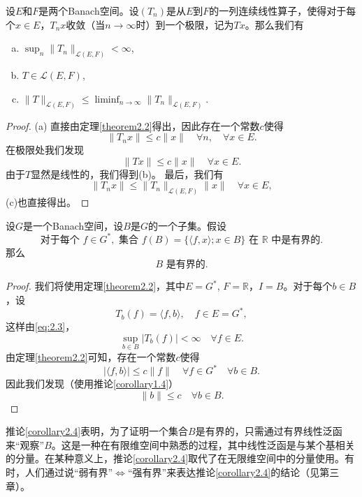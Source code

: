 \begin{corollary}\label{corollary2.3}
设$E$和$F$是两个Banach空间。设$(T_n)$是从$E$到$F$的一列连续线性算子，使得对于每个$x \in E$，$T_n x$收敛（当$n \to \infty$时）到一个极限，记为$Tx$。那么我们有
\begin{enumerate}[(a)]
\item $\sup_n \|T_n\|_{\mathcal{L}(E,F)} < \infty$,
\item $T \in \mathcal{L}(E,F)$,
\item $\|T\|_{\mathcal{L}(E,F)} \leq \liminf_{n \to \infty} \|T_n\|_{\mathcal{L}(E,F)}$.
\end{enumerate}
\end{corollary}

\begin{proof}
(a) 直接由定理\ref{theorem2.2}得出，因此存在一个常数$c$使得
\[
\|T_n x\| \leq c\|x\| \quad \forall n, \quad \forall x \in E.
\]
在极限处我们发现
\[
\|Tx\| \leq c\|x\| \quad \forall x \in E.
\]
由于$T$显然是线性的，我们得到(b)。
最后，我们有
\[
\|T_n x\| \leq \|T_n\|_{\mathcal{L}(E,F)} \|x\| \quad \forall x \in E,
\]
(c)也直接得出。
\end{proof}

\begin{corollary}\label{corollary2.4}
设$G$是一个Banach空间，设$B$是$G$的一个子集。假设
\begin{equation}
\text{对于每个 } f \in G^*, \text{ 集合 } f(B) = \{\langle f, x \rangle; x \in B\} \text{ 在 } \mathbb{R} \text{ 中是有界的}. \label{eq:2.3}
\end{equation}
那么
\begin{equation}
B \text{ 是有界的}. \label{eq:2.4}
\end{equation}
\end{corollary}

\begin{proof}
我们将使用定理\ref{theorem2.2}，其中$E=G^*$, $F=\mathbb{R}$，$I=B$。对于每个$b \in B$，设
\[
T_b(f) = \langle f, b \rangle, \quad f \in E = G^*,
\]
这样由\eqref{eq:2.3}，
\[
\sup_{b \in B} |T_b(f)| < \infty \quad \forall f \in E.
\]
由定理\ref{theorem2.2}可知，存在一个常数$c$使得
\[
|\langle f, b \rangle| \leq c\|f\| \quad \forall f \in G^* \quad \forall b \in B.
\]
因此我们发现（使用推论\ref{corollary1.4}）
\[
\|b\| \leq c \quad \forall b \in B.
\]
\end{proof}

\begin{remark}
推论\ref{corollary2.4}表明，为了证明一个集合$B$是有界的，只需通过有界线性泛函来“观察”$B$。这是一种在有限维空间中熟悉的过程，其中线性泛函是与某个基相关的分量。在某种意义上，推论\ref{corollary2.4}取代了在无限维空间中的分量使用。有时，人们通过说“弱有界”$\iff$“强有界”来表达推论\ref{corollary2.4}的结论（见第三章）。
\end{remark}

